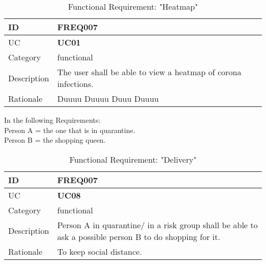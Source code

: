 \begin{comment}
\vspace{5mm}
\begin{table}[H]
	\begin{tabular}{ |p{2cm}||p{9cm}| }
		\hline
        ID & \textbf{FREQ005}\\ \hline
        UC & \textbf{UC01} \\ \hline
		Category & functional \\ \hline
		Description &
		
		\\ \hline
		Rationale &  \\ \hline
	\end{tabular}
	\caption{Functional Requirement: ""}
\end{table}
\end{comment}

\vspace{5mm}
\begin{table}[H]
	\begin{tabular}{ |p{2cm}||p{9cm}| }
		\hline
        ID & \textbf{FREQ007}\\ \hline
        UC & \textbf{UC01} \\ \hline
		Category & functional \\ \hline
		Description &
        The user shall be able to view a heatmap of corona infections.
		\\ \hline
		Rationale & Duuuu Duuuu Duuu Duuuu \\ \hline
	\end{tabular}
	\caption{Functional Requirement: "Heatmap"}
\end{table}

In the following Requirements: 
\\ Person A = the one that is in quarantine.
\\ Person B = the shopping queen. 

\vspace{5mm}
\begin{table}[H]
	\begin{tabular}{ |p{2cm}||p{9cm}| }
		\hline
        ID & \textbf{FREQ007}\\ \hline
        UC & \textbf{UC08} \\ \hline
		Category & functional \\ \hline
		Description &
        Person A in quarantine/ in a risk group shall be able to ask a 
        possible person B to do shopping for it.
		\\ \hline
		Rationale & To keep social distance. \\ \hline
	\end{tabular}
	\caption{Functional Requirement: "Delivery"}
\end{table}

